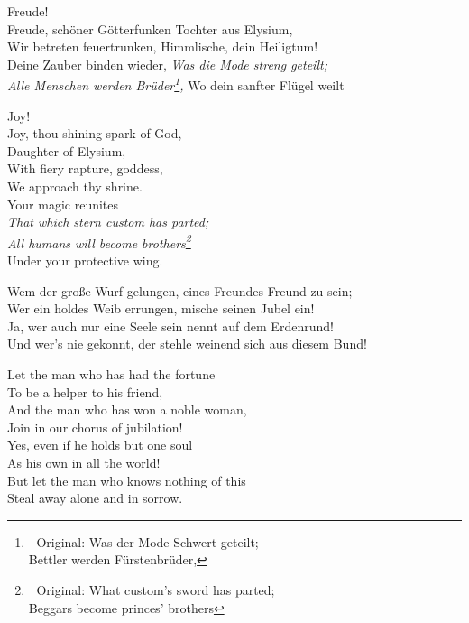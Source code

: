 \begin{paracol}{4}
\begin{Gverse}
Freude!\\
Freude, sch\"oner G\"otterfunken
Tochter aus Elysium,\\
Wir betreten feuertrunken,
Himmlische, dein Heiligtum!\\
Deine Zauber binden wieder,
{\itshape Was die Mode streng geteilt;\\
Alle Menschen werden Br\"uder\footnote{
Original: Was der Mode Schwert geteilt;\\
Bettler werden F\"urstenbr\"uder,},}
Wo dein sanfter Fl\"u\-gel weilt
\end{Gverse}
\begin{Everse}
Joy! \\
Joy, thou shining spark of God,\\
Daughter of Elysium,\\
With fiery rapture, goddess,\\
We approach thy shrine.\\
Your magic reunites\\
{\itshape That which stern custom has parted;\\
All humans will become brothers\footnote{
Original: 
What custom's sword has parted;\\
Beggars become princes' brothers}}\\
Under your protective wing.
\end{Everse}
\begin{Gverse}
Wem der gro{\ss}e Wurf gelungen,
eines Freundes Freund zu sein;\\
Wer ein holdes Weib errungen,
mische seinen Jubel ein!\\
Ja, wer auch nur eine Seele 
sein nennt auf dem Erdenrund!\\
Und wer's nie gekonnt, der stehle 
weinend sich aus diesem Bund! 
\end{Gverse}
\begin{Everse}
Let the man who has had the fortune\\
To be a helper to his friend,\\
And the man who has won a noble woman,\\
Join in our chorus of jubilation!\\
Yes, even if he holds but one soul\\
As his own in all the world!\\
But let the man who knows nothing of this\\
Steal away alone and in sorrow.
\end{Everse}

\end{paracol}
